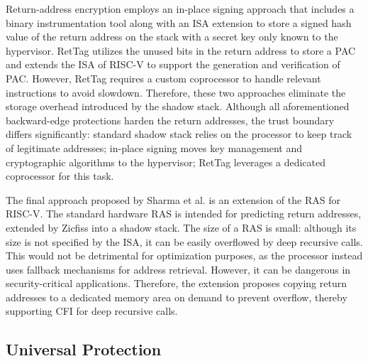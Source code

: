 \documentclass[journal,onecolumn]{IEEEtran}
\begin{document}
Return-address encryption employs an in-place signing approach that includes a binary instrumentation tool along with an ISA extension to store a signed hash value of the return address on the stack with a secret key only known to the hypervisor. RetTag utilizes the unused bits in the return address to store a PAC and extends the ISA of RISC-V to support the generation and verification of PAC. However, RetTag requires a custom coprocessor to handle relevant instructions to avoid slowdown. Therefore, these two approaches eliminate the storage overhead introduced by the shadow stack. Although all aforementioned backward-edge protections harden the return addresses, the trust boundary differs significantly: standard shadow stack relies on the processor to keep track of legitimate addresses; in-place signing moves key management and cryptographic algorithms to the hypervisor; RetTag leverages a dedicated coprocessor for this task. 

The final approach proposed by Sharma et al. is an extension of the RAS for RISC-V. The standard hardware RAS is intended for predicting return addresses, extended by Zicfiss into a shadow stack. The size of a RAS is small: although its size is not specified by the ISA, it can be easily overflowed by deep recursive calls\cite{Sharma26}. This would not be detrimental for optimization purposes, as the processor instead uses fallback mechanisms for address retrieval. However, it can be dangerous in security-critical applications. Therefore, the extension proposes copying return addresses to a dedicated memory area on demand to prevent overflow, thereby supporting CFI for deep recursive calls.

\subsection{Universal Protection}
\end{document}
